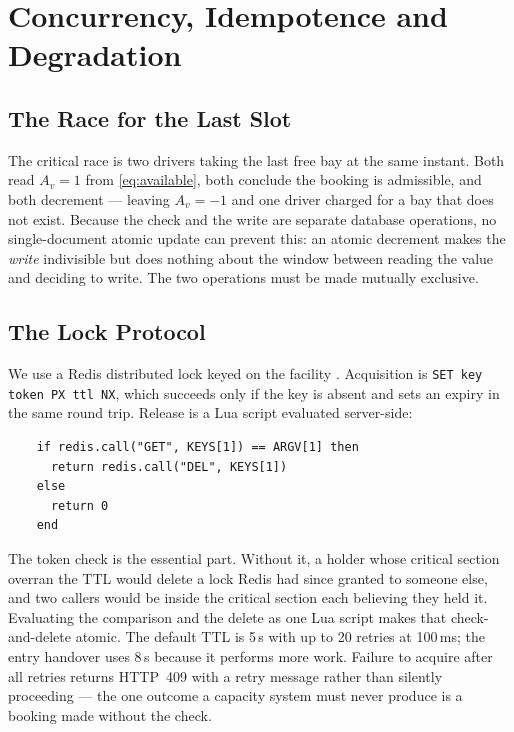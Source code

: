 \documentclass[journal,onecolumn,11pt]{IEEEtran}
\begin{document}
\section{Concurrency, Idempotence and Degradation}
\label{sec:concurrency}

\subsection{The Race for the Last Slot}

The critical race is two drivers taking the last free bay at the same instant.
Both read $A_v = 1$ from \eqref{eq:available}, both conclude the booking is
admissible, and both decrement --- leaving $A_v = -1$ and one driver charged
for a bay that does not exist. Because the check and the write are separate
database operations, no single-document atomic update can prevent this: an
atomic decrement makes the \emph{write} indivisible but does nothing about the
window between reading the value and deciding to write. The two operations must
be made mutually exclusive.

\subsection{The Lock Protocol}
\label{sec:lock}

We use a Redis distributed lock keyed on the facility \cite{redislocks}.
Acquisition is \texttt{SET key token PX ttl NX}, which succeeds only if the key
is absent and sets an expiry in the same round trip. Release is a Lua script
evaluated server-side:

\begin{verbatim}
    if redis.call("GET", KEYS[1]) == ARGV[1] then
      return redis.call("DEL", KEYS[1])
    else
      return 0
    end
\end{verbatim}

The token check is the essential part. Without it, a holder whose critical
section overran the TTL would delete a lock Redis had since granted to someone
else, and two callers would be inside the critical section each believing they
held it. Evaluating the comparison and the delete as one Lua script makes that
check-and-delete atomic. The default TTL is 5\,s with up to 20 retries at
100\,ms; the entry handover uses 8\,s because it performs more work. Failure to
acquire after all retries returns HTTP~409 with a retry message rather than
silently proceeding --- the one outcome a capacity system must never produce is
a booking made without the check.
\end{document}
